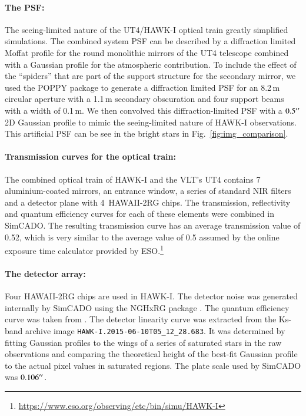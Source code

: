 \paragraph{The PSF:}
The seeing-limited nature of the UT4/HAWK-I optical train greatly simplified simulations. The combined system PSF can be described by a diffraction limited Moffat profile for the round monolithic mirrors of the UT4 telescope \citep{vlt_mirror} combined with a Gaussian profile for the atmospheric contribution. To include the effect of the ``spiders'' that are part of the support structure for the secondary mirror, we used the POPPY package to generate a diffraction limited PSF for an 8.2\,m circular aperture with a 1.1\,m secondary obscuration and four support beams with a width of  0.1\,m. We then convolved this diffraction-limited PSF with a $0.5^{\prime\prime}$ 2D Gaussian profile to mimic the seeing-limited nature of HAWK-I observations. This artificial PSF can be see in the bright stars in Fig.~\ref{fig:img_comparison}.

\paragraph{Transmission curves for the optical train:}
The combined optical train of HAWK-I and the VLT's UT4 contains 7 aluminium-coated mirrors, an entrance window, a series of standard NIR filters and a detector plane with 4~HAWAII-2RG chips. The transmission, reflectivity and quantum efficiency curves for each of these elements were combined in SimCADO. The resulting transmission curve has an average transmission value of 0.52, which is very similar to the average value of 0.5 assumed by the online exposure time calculator provided by ESO.\footnote{\url{https://www.eso.org/observing/etc/bin/simu/HAWK-I}}

\paragraph{The detector array:}
Four HAWAII-2RG chips \citep{hawaii2rg} are used in HAWK-I. The detector noise was generated internally by SimCADO using the NGHxRG package \citep{nghxrg}. The quantum efficiency curve was taken from \citet{finger2008}. The detector linearity curve was extracted from the Ks-band archive image \verb+HAWK-I.2015-06-10T05_12_28.683+. It was determined by fitting Gaussian profiles to the wings of a series of saturated stars in the raw observations and comparing the theoretical height of the best-fit Gaussian profile to the actual pixel values in saturated regions. The plate scale used by SimCADO was $0.106^{\prime\prime}$.

